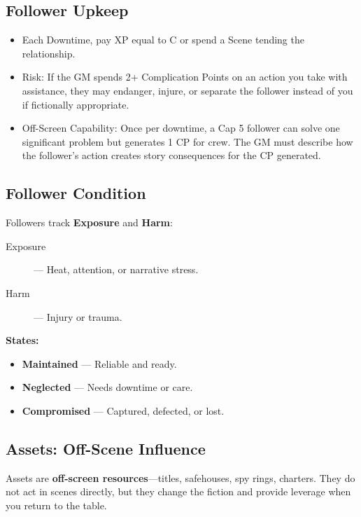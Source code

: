 \subsection*{Follower Upkeep}

\begin{itemize}
    \item Each Downtime, pay XP equal to C or spend a Scene tending the relationship.
    \item Risk: If the GM spends 2+ Complication Points on an action you take with assistance, they may endanger, injure, or separate the follower instead of you if fictionally appropriate.
    \item Off-Screen Capability: Once per downtime, a Cap 5 follower can solve one significant problem but generates 1 CP for crew. The GM must describe how the follower's action creates story consequences for the CP generated.
\end{itemize}

\subsection*{Follower Condition}

Followers track \textbf{Exposure} and \textbf{Harm}:

\begin{description}
    \item[Exposure] --- Heat, attention, or narrative stress.
    \item[Harm] --- Injury or trauma.
\end{description}

\textbf{States:}
\begin{itemize}
    \item \textbf{Maintained} --- Reliable and ready.
    \item \textbf{Neglected} --- Needs downtime or care.
    \item \textbf{Compromised} --- Captured, defected, or lost.
\end{itemize}

\subsection*{Assets: Off-Scene Influence}

Assets are \textbf{off-screen resources}---titles, safehouses, spy rings, charters. They do not act in scenes directly, but they change the fiction and provide leverage when you return to the table.

